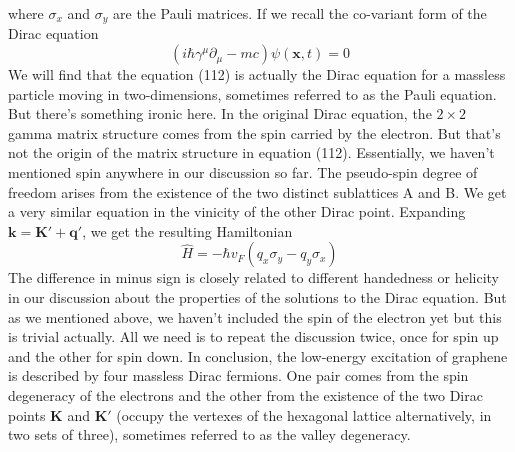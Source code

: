 \documentclass{article}
\begin{document}
where $\sigma_x$ and $\sigma_y$ are the Pauli matrices. If we recall the co-variant form of the Dirac equation\begin{equation}
    (i\hbar\gamma^\mu\partial_\mu-mc)\psi(\mathbf{x},t)=0
\end{equation}
We will find that the equation (112) is actually the Dirac equation for a massless particle moving in two-dimensions, sometimes referred to as the Pauli equation. But there's something ironic here. In the original Dirac equation, the $2\times2$ gamma matrix structure comes from the spin carried by the electron. But that's not the origin of the matrix structure in equation (112). Essentially, we haven't mentioned spin anywhere in our discussion so far. The pseudo-spin degree of freedom arises from the existence of the two distinct sublattices A and B. We get a very similar equation in the vinicity of the other Dirac point. Expanding $\mathbf{k}=\mathbf{K}'+\mathbf{q}'$, we get the resulting Hamiltonian\begin{equation}
    \hat{H}=-\hbar{v}_F(q_x\sigma_y-q_y\sigma_x)
\end{equation}
The difference in minus sign is closely related to different handedness or helicity in our discussion about the properties of the solutions to the Dirac equation. But as we mentioned above, we haven't included the spin of the electron yet but this is trivial actually. All we need is to repeat the discussion twice, once for spin up and the other for spin down. In conclusion, the low-energy excitation of graphene is described by four massless Dirac fermions. One pair comes from the spin degeneracy of the electrons and the other from the existence of the two Dirac points $\mathbf{K}$ and $\mathbf{K}'$ (occupy the vertexes of the hexagonal lattice alternatively, in two sets of three), sometimes referred to as the valley degeneracy.
\end{document}
